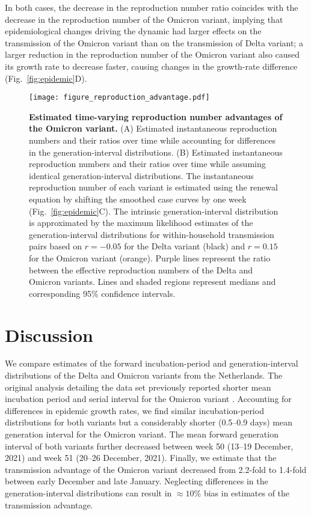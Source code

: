 \documentclass[12pt]{article}
\newcommand{\fref}[1]{Fig.~\ref{fig:#1}}
\begin{document}
In both cases, the decrease in the reproduction number ratio coincides with the decrease in the reproduction number of the Omicron variant, implying that epidemiological changes driving the dynamic had larger effects on the transmission of the Omicron variant than on the transmission of Delta variant;
a larger reduction in the reproduction number of the Omicron variant also caused its growth rate to decrease faster, causing changes in the growth-rate difference (\fref{epidemic}D).


\begin{figure}[!th]
\texttt{[image: figure\_reproduction\_advantage.pdf]}
\caption{
\textbf{Estimated time-varying reproduction number advantages of the Omicron variant.}
(A) Estimated instantaneous reproduction numbers and their ratios over time while accounting for differences in the generation-interval distributions.
(B) Estimated instantaneous reproduction numbers and their ratios over time while assuming identical generation-interval distributions.
The instantaneous reproduction number of each variant is estimated using the renewal equation by shifting the smoothed case curves by one week (\fref{epidemic}C).
The intrinsic generation-interval distribution is approximated by the maximum likelihood estimates of the generation-interval distributions for within-household transmission pairs based on $r=-0.05$ for the Delta variant (black) and $r=0.15$ for the Omicron variant (orange).
Purple lines represent the ratio between the effective reproduction numbers of the Delta and Omicron variants.
Lines and shaded regions represent medians and corresponding 95\% confidence intervals.
\label{fig:reproduction}
}
\end{figure}

\section{Discussion}

We compare estimates of the forward incubation-period and generation-interval distributions of the Delta and Omicron variants from the Netherlands.
The original analysis detailing the data set previously reported shorter mean incubation period and serial interval for the Omicron variant \citep{backer2021omicron}.
Accounting for differences in epidemic growth rates, we find similar incubation-period distributions for both variants but a considerably shorter (0.5--0.9 days) mean generation interval for the Omicron variant.
The mean forward generation interval of both variants further decreased between week 50 (13--19 December, 2021) and week 51 (20--26 December, 2021).
Finally, we estimate that the transmission advantage of the Omicron variant decreased from 2.2-fold to 1.4-fold between early December and late January. 
Neglecting differences in the generation-interval distributions can result in $\approx 10\%$ bias in estimates of the transmission advantage.
\end{document}
